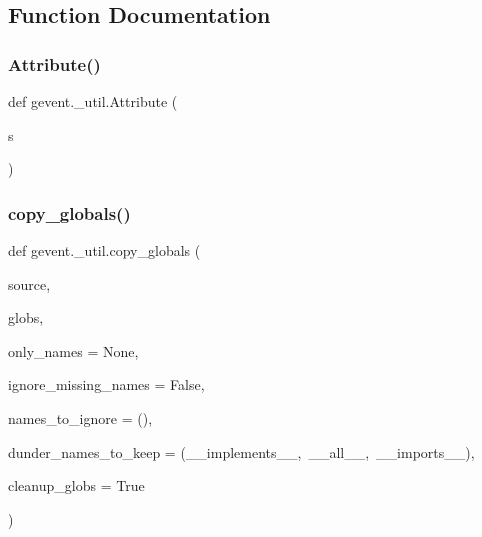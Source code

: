 \subsection{Function Documentation}
\mbox{\label{namespacegevent_1_1__util_a5adf631bc83884e0b9073c856e2fe07d}} 
\subsubsection{\texorpdfstring{Attribute()}{Attribute()}}
{\footnotesize\ttfamily def gevent.\+\_\+util.\+Attribute (\begin{DoxyParamCaption}\item[{}]{s }\end{DoxyParamCaption})}

\mbox{\label{namespacegevent_1_1__util_a84388abb8007bba4ac72f0bc1eee09d8}} 
\subsubsection{\texorpdfstring{copy\+\_\+globals()}{copy\_globals()}}
{\footnotesize\ttfamily def gevent.\+\_\+util.\+copy\+\_\+globals (\begin{DoxyParamCaption}\item[{}]{source,  }\item[{}]{globs,  }\item[{}]{only\+\_\+names = {\ttfamily None},  }\item[{}]{ignore\+\_\+missing\+\_\+names = {\ttfamily False},  }\item[{}]{names\+\_\+to\+\_\+ignore = {\ttfamily ()},  }\item[{}]{dunder\+\_\+names\+\_\+to\+\_\+keep = {\ttfamily (\textquotesingle{}\+\_\+\+\_\+implements\+\_\+\+\_\+\textquotesingle{},~\textquotesingle{}\+\_\+\+\_\+all\+\_\+\+\_\+\textquotesingle{},~\textquotesingle{}\+\_\+\+\_\+imports\+\_\+\+\_\+\textquotesingle{})},  }\item[{}]{cleanup\+\_\+globs = {\ttfamily True} }\end{DoxyParamCaption})}

